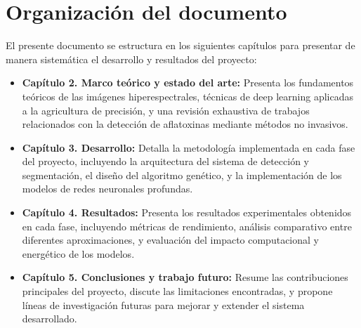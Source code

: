 \section{Organización del documento}
El presente documento se estructura en los siguientes capítulos para presentar de manera sistemática el desarrollo y resultados del proyecto:

\begin{itemize}
    \item \textbf{Capítulo 2. Marco teórico y estado del arte:} Presenta los fundamentos teóricos de las imágenes hiperespectrales, técnicas de deep learning aplicadas a la agricultura de precisión, y una revisión exhaustiva de trabajos relacionados con la detección de aflatoxinas mediante métodos no invasivos.
    \item \textbf{Capítulo 3. Desarrollo:} Detalla la metodología implementada en cada fase del proyecto, incluyendo la arquitectura del sistema de detección y segmentación, el diseño del algoritmo genético, y la implementación de los modelos de redes neuronales profundas.
    \item \textbf{Capítulo 4. Resultados:} Presenta los resultados experimentales obtenidos en cada fase, incluyendo métricas de rendimiento, análisis comparativo entre diferentes aproximaciones, y evaluación del impacto computacional y energético de los modelos.
    \item \textbf{Capítulo 5. Conclusiones y trabajo futuro:} Resume las contribuciones principales del proyecto, discute las limitaciones encontradas, y propone líneas de investigación futuras para mejorar y extender el sistema desarrollado.
\end{itemize}
